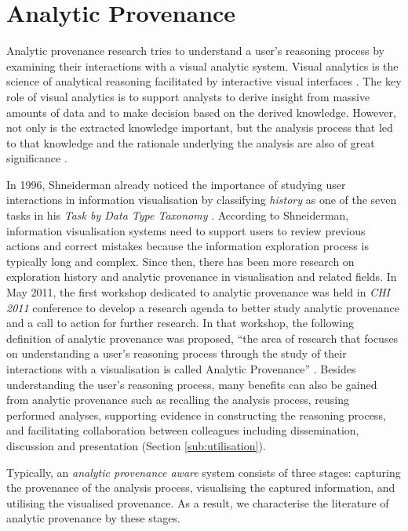 \section{Analytic Provenance}
Analytic provenance research tries to understand a user's reasoning process by examining their interactions with a visual analytic system. Visual analytics is the science of analytical reasoning facilitated by interactive visual interfaces \cite{Thomas2005}. The key role of visual analytics is to support analysts to derive insight from massive amounts of data and to make decision based on the derived knowledge. However, not only is the extracted knowledge important, but the analysis process that led to that knowledge and the rationale underlying the analysis are also of great significance \cite{North2011, Heer2008}.

In 1996, Shneiderman already noticed the importance of studying user interactions in information visualisation by classifying \textit{history} as one of the seven tasks in his \textit{Task by Data Type Taxonomy} \cite{Shneiderman1996}. According to Shneiderman, information visualisation systems need to support users to review previous actions and correct mistakes because the information exploration process is typically long and complex. Since then, there has been more research on exploration history and analytic provenance in visualisation and related fields. In May 2011, the first workshop dedicated to analytic provenance was held in \textit{CHI 2011} conference to develop a research agenda to better study analytic provenance and a call to action for further research. In that workshop, the following definition of analytic provenance was proposed, ``the area of research that focuses on understanding a user's reasoning process through the study of their interactions with a visualisation is called Analytic Provenance'' \cite[p.33]{North2011}. Besides understanding the user's reasoning process, many benefits can also be gained from analytic provenance such as recalling the analysis process, reusing performed analyses, supporting evidence in constructing the reasoning process, and facilitating collaboration between colleagues including dissemination, discussion and presentation (Section \ref{sub:utilisation}). 

Typically, an \textit{analytic provenance aware} system consists of three stages: capturing the provenance of the analysis process, visualising the captured information, and utilising the visualised provenance. As a result, we characterise the literature of analytic provenance by these stages.

